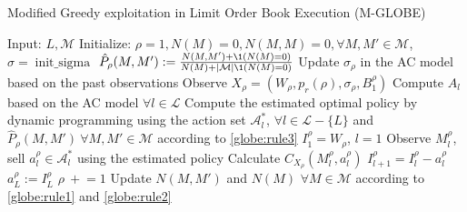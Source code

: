             \begin{algorithm}
                \caption[Modified GLOBE Algorithm]{Modified Greedy exploitation in Limit Order Book Execution (M-GLOBE)}
                \begin{algorithmic}
                    \State Input: $L, \mathcal{M}$
                    \State Initialize: $\rho = 1, N(M)=0, N(M,M)=0, \forall M, M' \in \mathcal{M}$, $\sigma = \operatorname{init\_sigma}$
                        \State $\hat P_\rho (M, M') := \frac{N(M, M') + \1(N(M) = 0)}{N(M) + |\mathcal M| \1 (N(M) = 0)}$
                        \State Update $\sigma_\rho$ in the AC model based on the past observations
                        \State Observe $X_\rho = (W_\rho, p_r(\rho), \sigma_\rho, B_1^\rho)$
                        \State Compute $A_l$ based on the AC model $\forall l \in \mathcal{L}$
                        \State Compute the estimated optimal policy by dynamic programming using the action set $\mathcal A_l^*$, $\forall l \in \mathcal{L} - \{L\}$ and $\hat P_\rho (M, M')\ \forall M, M' \in \mathcal M$ according to \eqref{globe:rule3}
                        \State $I_1^\rho = W_\rho$, $l=1$
                            \State Observe $M_l^\rho$, sell $a_l^\rho\in \mathcal{A}^*_l$ using the estimated policy
                            \State Calculate $C_{X_\rho}(M_l^\rho, a_l^\rho)$
                            \State $I_{l+1}^\rho = I_l^\rho - a_l^\rho$
                        \EndFor
                        \State $a_{L}^\rho := I_L^\rho$
                        \State $\rho\ +\!\!= 1$
                        \State Update $N(M, M')$ and $N(M)$ $\forall M \in \mathcal{M}$ according to \eqref{globe:rule1} and \eqref{globe:rule2}
                    \EndWhile
                \end{algorithmic}
                \label{algorithm:MGLOBE}
            \end{algorithm}



